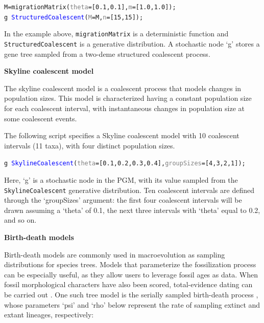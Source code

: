 \documentclass[10pt,letterpaper,table]{article}
\theoremstyle{definition}
\begin{document}
{\small
  \begin{alltt}
    M = \textcolor{generator}{migrationMatrix}(\textcolor{gray}{theta}=[\textcolor{constant}{0.1}, \textcolor{constant}{0.1}], \textcolor{gray}{m}=[\textcolor{constant}{1.0}, \textcolor{constant}{1.0}]);
    \textcolor{bluishgreen}{g} ~ \textcolor{blue}{StructuredCoalescent}(\textcolor{gray}{M}=M, \textcolor{gray}{n}=[\textcolor{constant}{15}, \textcolor{constant}{15}]);
  \end{alltt}
}

In the example above, \texttt{migrationMatrix} is a deterministic function and \texttt{StructuredCoalescent} is a generative distribution. 
A stochastic node `g' stores a gene tree sampled from a two-deme structured coalescent process.
\newline

\textbf{Skyline coalescent model}

The skyline coalescent model \cite{drummond2005bayesian} is a coalescent process that models changes in population sizes.
This model is characterized having a constant population size for each coalescent interval, with instantaneous changes in population size at some coalescent events.

The following script specifies a Skyline coalescent model with 10 coalescent intervals (11 taxa), with four distinct population sizes.

{\small
  \begin{alltt}
    \textcolor{bluishgreen}{g} ~ \textcolor{blue}{SkylineCoalescent}(\textcolor{gray}{theta}=[\textcolor{constant}{0.1}, \textcolor{constant}{0.2}, \textcolor{constant}{0.3}, \textcolor{constant}{0.4}], \textcolor{gray}{groupSizes}=[\textcolor{constant}{4},\textcolor{constant}{3},\textcolor{constant}{2},\textcolor{constant}{1}]);
  \end{alltt}
}

Here, `g' is a stochastic node in the PGM, with its value sampled from the \texttt{SkylineCoalescent} generative distribution. Ten coalescent intervals are defined through the `groupSizes' argument: the first four coalescent intervals will be drawn assuming a `theta' of 0.1, the next three intervals with `theta' equal to 0.2, and so on.
\newline

\textbf{Birth-death models}

Birth-death models are commonly used in macroevolution as sampling distributions for species trees. 
Models that parameterize the fossilization process can be especially useful, as they allow users to leverage fossil ages as data. 
When fossil morphological characters have also been scored, total-evidence dating can be carried out \cite{ogilvie21}. 
One such tree model is the serially sampled birth-death process \cite{stadler2013dating}, whose parameters `psi' and `rho' below represent the rate of sampling extinct and extant lineages, respectively:
\end{document}
